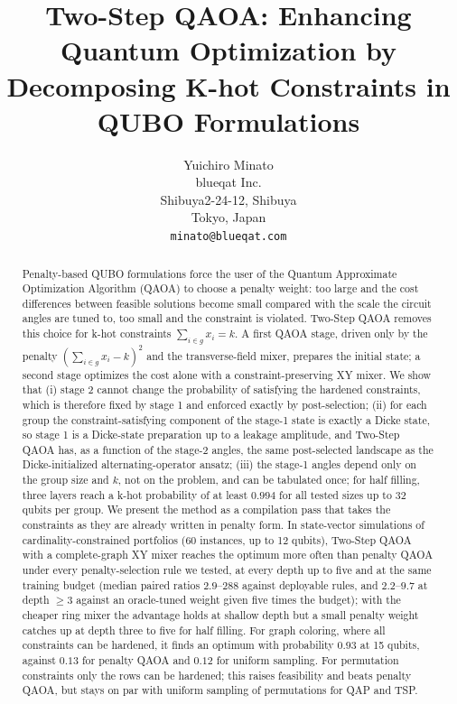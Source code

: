 \documentclass{article}
\title{Two-Step QAOA: Enhancing Quantum Optimization by Decomposing K-hot Constraints in QUBO Formulations}
\author{
  Yuichiro Minato \\
  blueqat Inc. \\
  Shibuya2-24-12, Shibuya \\
  Tokyo, Japan\\
  \texttt{minato@blueqat.com} \\
}
\begin{document}
\maketitle

\begin{abstract}
Penalty-based QUBO formulations force the user of the Quantum Approximate Optimization Algorithm (QAOA) to choose a penalty weight: too large and the cost differences between feasible solutions become small compared with the scale the circuit angles are tuned to, too small and the constraint is violated.
Two-Step QAOA removes this choice for k-hot constraints $\sum_{i\in g}x_i=k$.
A first QAOA stage, driven only by the penalty $(\sum_{i\in g}x_i-k)^2$ and the transverse-field mixer, prepares the initial state; a second stage optimizes the cost alone with a constraint-preserving XY mixer.
We show that (i) stage 2 cannot change the probability of satisfying the hardened constraints, which is therefore fixed by stage 1 and enforced exactly by post-selection;
(ii) for each group the constraint-satisfying component of the stage-1 state is exactly a Dicke state, so stage 1 is a Dicke-state preparation up to a leakage amplitude, and Two-Step QAOA has, as a function of the stage-2 angles, the same post-selected landscape as the Dicke-initialized alternating-operator ansatz;
(iii) the stage-1 angles depend only on the group size and $k$, not on the problem, and can be tabulated once; for half filling, three layers reach a k-hot probability of at least $0.994$ for all tested sizes up to 32 qubits per group.
We present the method as a compilation pass that takes the constraints as they are already written in penalty form.
In state-vector simulations of cardinality-constrained portfolios (60 instances, up to 12 qubits), Two-Step QAOA with a complete-graph XY mixer reaches the optimum more often than penalty QAOA under every penalty-selection rule we tested, at every depth up to five and at the same training budget (median paired ratios $2.9$--$288$ against deployable rules, and $2.2$--$9.7$ at depth $\ge3$ against an oracle-tuned weight given five times the budget); with the cheaper ring mixer the advantage holds at shallow depth but a small penalty weight catches up at depth three to five for half filling.
For graph coloring, where all constraints can be hardened, it finds an optimum with probability $0.93$ at 15 qubits, against $0.13$ for penalty QAOA and $0.12$ for uniform sampling.
For permutation constraints only the rows can be hardened; this raises feasibility and beats penalty QAOA, but stays on par with uniform sampling of permutations for QAP and TSP.
\end{abstract}
\end{document}
